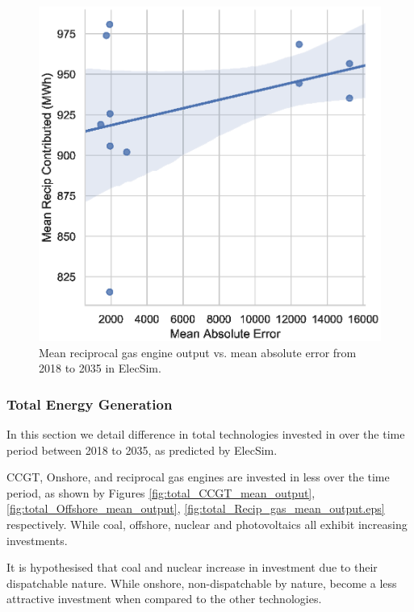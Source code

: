 \documentclass[final,3p,times,twocolumn,numbers]{elsarticle}
\begin{document}
\begin{figure}
\centering
\includegraphics[width=\columnwidth]{figures/results/elecsim_results/contributed_Recip_gas_mean_output.eps}
\caption{Mean reciprocal gas engine output vs. mean absolute error from 2018 to 2035 in ElecSim.}
\label{fig:contributed_Recip_gas_mean_output}
\end{figure}




\subsubsection{Total Energy Generation}



In this section we detail difference in total technologies invested in over the time period between 2018 to 2035, as predicted by ElecSim.

CCGT, Onshore, and reciprocal gas engines are invested in less over the time period, as shown by Figures \ref{fig:total_CCGT_mean_output}, \ref{fig:total_Offshore_mean_output}, \ref{fig:total_Recip_gas_mean_output.eps} respectively. While coal, offshore, nuclear and photovoltaics all exhibit increasing investments.

It is hypothesised that coal and nuclear increase in investment due to their dispatchable nature. While onshore, non-dispatchable by nature, become a less attractive investment when compared to the other technologies.
\end{document}
